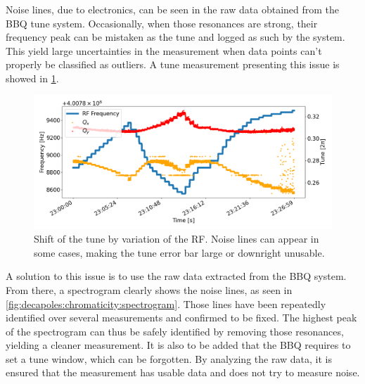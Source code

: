 \subsubsection{}

Noise lines, due to electronics, can be seen in the raw data obtained from the BBQ tune system.
Occasionally, when those resonances are strong, their frequency peak can be mistaken as the tune and
logged as such by the system. This yield large uncertainties in the measurement when data points 
can't properly be classified as outliers. A tune measurement presenting this issue is showed in 
\cref{fig:decapoles:chromaticity:noisy_tune}.

\begin{figure}[H]
    \centering
    \includegraphics[width=\textwidth]{./images/noisy_tune.png}
    \caption{Shift of the tune by variation of the RF. Noise lines can appear in some cases,
    making the tune error bar large or downright unusable.}
    \label{fig:decapoles:chromaticity:noisy_tune}
\end{figure}

A solution to this issue is to use the raw data extracted from the BBQ system. From there, a
spectrogram clearly shows the noise lines, as seen in \cref{fig:decapoles:chromaticity:spectrogram}.
Those lines have been repeatedly identified over several measurements and confirmed to be fixed.
The highest peak of the spectrogram can thus be safely identified by removing those resonances,
yielding a cleaner measurement. It is also to be added that the BBQ requires to set a tune window,
which can be forgotten. By analyzing the raw data, it is ensured that the measurement has usable
data and does not try to measure noise.

